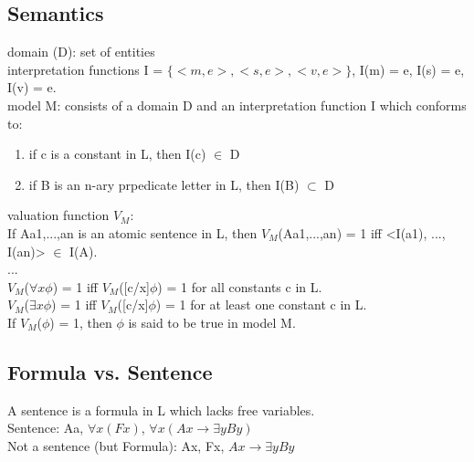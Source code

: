 \subsection*{Semantics}
domain (D): set of entities \\
interpretation functions I = $\{<m, e>, <s, e>, <v, e> \}$, I(m) = e, I(s) = e, I(v) = e. \\
model M: consists of a domain D and an interpretation function I which conforms to:

\begin{enumerate}
\item if c is a constant in L, then I(c) $\in$ D
\item if B is an n-ary prpedicate letter in L, then I(B) $\subset$ D
\end{enumerate}

valuation function $V_M$: \\
If Aa1,...,an is an atomic sentence in L, then $V_M$(Aa1,...,an) = 1 iff <I(a1), ..., I(an)> $\in$ I(A). \\
... \\
$V_M$($\forall x \phi$) = 1 iff $V_M$([c/x]$\phi$) = 1 for all constants c in L. \\
$V_M$($\exists x \phi$) = 1 iff $V_M$([c/x]$\phi$) = 1 for at least one constant c in L. \\
If $V_M$($\phi$) = 1, then $\phi$ is said to be true in model M.

\subsection*{Formula vs. Sentence}
A sentence is a formula in L which lacks free variables. \\
Sentence: Aa, $\forall x (Fx)$, $\forall x (Ax \to \exists y By)$ \\
Not a sentence (but Formula): Ax, Fx, $Ax \to \exists y By$

